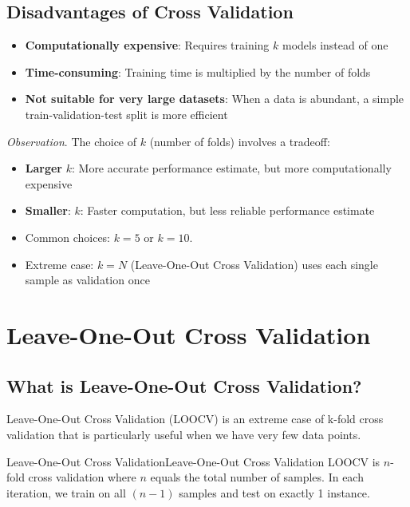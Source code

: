 \documentclass[a4paper]{article}
\theoremstyle{definition}
\begin{document}
\subsection{Disadvantages of Cross Validation}
\begin{itemize}
    \item \textbf{Computationally expensive}: Requires training \( k \) models instead of one 
    \item \textbf{Time-consuming}: Training time is multiplied by the number of folds 
    \item \textbf{Not suitable for very large datasets}: When a data is abundant, a simple train-validation-test split is more efficient
\end{itemize}
\textit{Observation}. The choice of \( k \) (number of folds) involves a tradeoff:
\begin{itemize}
    \item \textbf{Larger} \( k \): More accurate performance estimate, but more computationally expensive 
    \item \textbf{Smaller}: \( k \): Faster computation, but less reliable performance estimate 
    \item Common choices: \( k = 5 \) or \( k = 10 \).
    \item Extreme case: \( k = N \) (Leave-One-Out Cross Validation) uses each single sample as validation once
\end{itemize}
\section{Leave-One-Out Cross Validation}
\subsection{What is Leave-One-Out Cross Validation?}
Leave-One-Out Cross Validation (LOOCV) is an extreme case of k-fold cross validation that is particularly useful when we have 
very few data points.
\begin{definition}{Leave-One-Out Cross Validation}{Leave-One-Out Cross Validation} 
LOOCV is \( n \)-fold cross validation where \( n \) equals the total number of samples.
In each iteration, we train on all \( (n - 1) \) samples and test on exactly 1 instance.
\end{definition}
\end{document}
